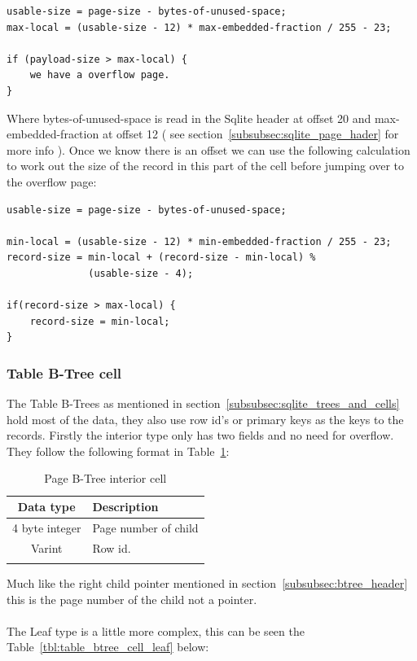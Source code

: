 \begin{lstlisting}	
usable-size = page-size - bytes-of-unused-space;
max-local = (usable-size - 12) * max-embedded-fraction / 255 - 23;

if (payload-size > max-local) {
	we have a overflow page.
}
\end{lstlisting}

Where bytes-of-unused-space is read in the Sqlite header at offset 20 and \newline max-embedded-fraction at offset 12 ( see section~\ref{subsubsec:sqlite_page_hader} for more info ). Once we know there is an offset we can use the following calculation to work out the size of the record in this part of the cell before jumping over to the overflow page:  

\begin{lstlisting}	
usable-size = page-size - bytes-of-unused-space;

min-local = (usable-size - 12) * min-embedded-fraction / 255 - 23;
record-size = min-local + (record-size - min-local) % 
			  (usable-size - 4);

if(record-size > max-local) {
	record-size = min-local;
}
\end{lstlisting}

\subsubsection{Table B-Tree cell}
\label{subsubsec:table_btree_cell}

The Table B-Trees as mentioned in section~\ref{subsubsec:sqlite_trees_and_cells} hold most of the data, they also use row id's or primary keys as the keys to the records. Firstly the interior type only has two fields and no need for overflow. They follow the following format in Table~\ref{tbl:table_btree_cell_interior}: 

\begin{longtable}[h]{| c | p{5cm} |}
		\hline
			\textbf{Data type} & \textbf{Description} \\ 
		\hline
		\endhead
			4 byte integer & Page number of child \\
		\hline
			Varint & Row id. \\
		\hline
	\caption{Page B-Tree interior cell}
	\label{tbl:table_btree_cell_interior}
\end{longtable}

Much like the right child pointer mentioned in section~\ref{subsubsec:btree_header} this is the page number of the child not a pointer. 
\\\\
The Leaf type is a little more complex, this can be seen the Table~\ref{tbl:table_btree_cell_leaf} below:

